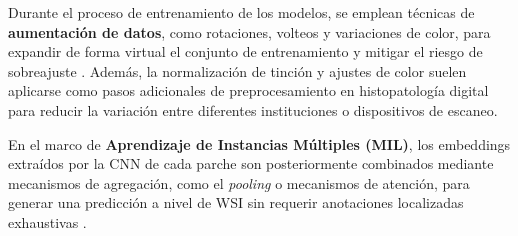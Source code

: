 Durante el proceso de entrenamiento de los modelos, se emplean técnicas de \textbf{aumentación de datos},  como rotaciones, volteos y variaciones de color, para expandir de forma virtual el conjunto de entrenamiento y mitigar el riesgo de sobreajuste \cite{CNNMedicalReview2025}. Además, la normalización de tinción y ajustes de color suelen aplicarse como pasos adicionales de preprocesamiento en histopatología digital para reducir la variación entre diferentes instituciones o dispositivos de escaneo. \newline

En el marco de \textbf{Aprendizaje de Instancias Múltiples (MIL)}, los embeddings extraídos por la CNN de cada parche son posteriormente combinados mediante mecanismos de agregación, como el \textit{pooling} o mecanismos de atención, para generar una predicción a nivel de WSI sin requerir anotaciones localizadas exhaustivas \cite{DLDigitalPathologySurvey2020}.
